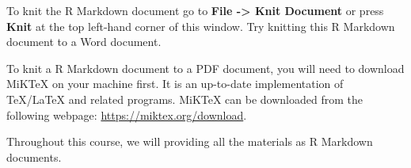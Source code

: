 \documentclass[
]{article}
\begin{document}
To knit the R Markdown document go to \textbf{File -\textgreater{} Knit
Document} or press \textbf{Knit} at the top left-hand corner of this
window. Try knitting this R Markdown document to a Word document.

To knit a R Markdown document to a PDF document, you will need to
download MiKTeX on your machine first. It is an up-to-date
implementation of TeX/LaTeX and related programs. MiKTeX can be
downloaded from the following webpage:
\url{https://miktex.org/download}.

Throughout this course, we will providing all the materials as R
Markdown documents.
\end{document}
